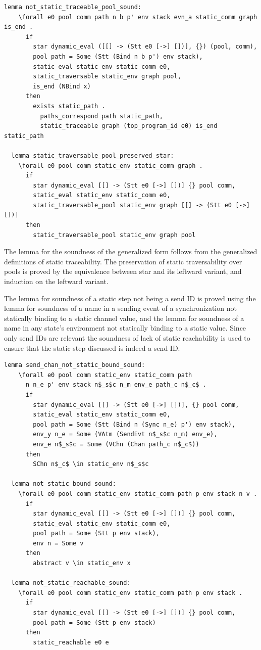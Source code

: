 \documentclass[10pt]{article}
\begin{document}
\begin{lstlisting}[language=logic, mathescape]
  lemma not_static_traceable_pool_sound:
    \forall e0 pool comm path n b p' env stack evn_a static_comm graph is_end .
      if
        star dynamic_eval ([[] -> (Stt e0 [->] [])], {}) (pool, comm), 
        pool path = Some (Stt (Bind n b p') env stack), 
        static_eval static_env static_comm e0, 
        static_traversable static_env graph pool, 
        is_end (NBind x)
      then
        exists static_path . 
          paths_correspond path static_path, 
          static_traceable graph (top_program_id e0) is_end static_path

  lemma static_traversable_pool_preserved_star:
    \forall e0 pool comm static_env static_comm graph .
      if
        star dynamic_eval [[] -> (Stt e0 [->] [])] {} pool comm, 
        static_eval static_env static_comm e0,
        static_traversable_pool static_env graph [[] -> (Stt e0 [->] [])]
      then
        static_traversable_pool static_env graph pool 
\end{lstlisting}


The lemma for the soundness of the generalized form follows from the generalized definitions
of static traceability. The preservation of static traversability over pools is proved by the
equivalence between star and its leftward variant, and induction on the leftward variant.

The lemma for soundness of a static step not being a send ID is proved using the lemma for
soundness of a name in a sending event of a synchronization not statically binding to a static
channel value, and the lemma for soundness of a name in any state's environment
not statically binding to a static value.  Since only send IDs are relevant
the soundness of lack of static reachability is
used to ensure that the static step discussed is indeed a send ID. 

\begin{lstlisting}[language=logic, mathescape]
  lemma send_chan_not_static_bound_sound:
    \forall e0 pool comm static_env static_comm path
      n n_e p' env stack n$_s$c n_m env_e path_c n$_c$ .
      if
        star dynamic_eval [[] -> (Stt e0 [->] [])], {} pool comm,
        static_eval static_env static_comm e0,
        pool path = Some (Stt (Bind n (Sync n_e) p') env stack),
        env_y n_e = Some (VAtm (SendEvt n$_s$c n_m) env_e),
        env_e n$_s$c = Some (VChn (Chan path_c n$_c$))
      then
        SChn n$_c$ \in static_env n$_s$c

  lemma not_static_bound_sound:
    \forall e0 pool comm static_env static_comm path p env stack n v .
      if
        star dynamic_eval [[] -> (Stt e0 [->] [])] {} pool comm,
        static_eval static_env static_comm e0, 
        pool path = Some (Stt p env stack), 
        env n = Some v
      then
        abstract v \in static_env x

  lemma not_static_reachable_sound:
    \forall e0 pool comm static_env static_comm path p env stack .
      if
        star dynamic_eval [[] -> (Stt e0 [->] [])] {} pool comm,
        pool path = Some (Stt p env stack)
      then
        static_reachable e0 e
\end{lstlisting}
\end{document}
